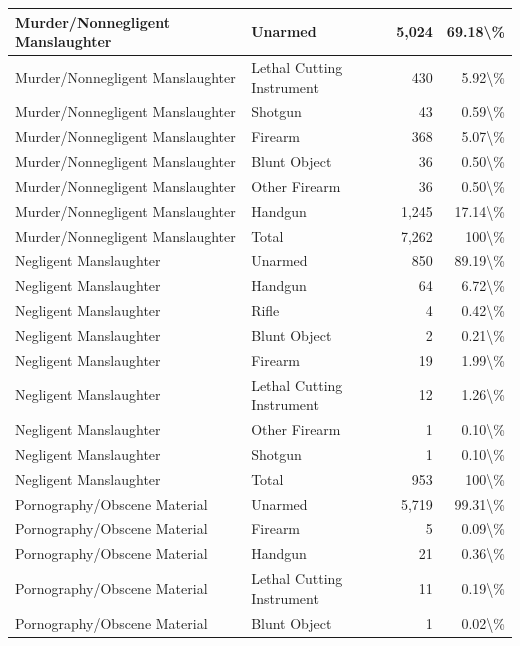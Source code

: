 \documentclass[
]{krantz}
\begin{document}
\begin{longtable}[t]{l|l|r|r}
\hline
Murder/Nonnegligent Manslaughter & Unarmed & 5,024 & 69.18\textbackslash{}\%\\
\hline
Murder/Nonnegligent Manslaughter & Lethal Cutting Instrument & 430 & 5.92\textbackslash{}\%\\
\hline
Murder/Nonnegligent Manslaughter & Shotgun & 43 & 0.59\textbackslash{}\%\\
\hline
Murder/Nonnegligent Manslaughter & Firearm & 368 & 5.07\textbackslash{}\%\\
\hline
Murder/Nonnegligent Manslaughter & Blunt Object & 36 & 0.50\textbackslash{}\%\\
\hline
Murder/Nonnegligent Manslaughter & Other Firearm & 36 & 0.50\textbackslash{}\%\\
\hline
Murder/Nonnegligent Manslaughter & Handgun & 1,245 & 17.14\textbackslash{}\%\\
\hline
Murder/Nonnegligent Manslaughter & Total & 7,262 & 100\textbackslash{}\%\\
\hline
Negligent Manslaughter & Unarmed & 850 & 89.19\textbackslash{}\%\\
\hline
Negligent Manslaughter & Handgun & 64 & 6.72\textbackslash{}\%\\
\hline
Negligent Manslaughter & Rifle & 4 & 0.42\textbackslash{}\%\\
\hline
Negligent Manslaughter & Blunt Object & 2 & 0.21\textbackslash{}\%\\
\hline
Negligent Manslaughter & Firearm & 19 & 1.99\textbackslash{}\%\\
\hline
Negligent Manslaughter & Lethal Cutting Instrument & 12 & 1.26\textbackslash{}\%\\
\hline
Negligent Manslaughter & Other Firearm & 1 & 0.10\textbackslash{}\%\\
\hline
Negligent Manslaughter & Shotgun & 1 & 0.10\textbackslash{}\%\\
\hline
Negligent Manslaughter & Total & 953 & 100\textbackslash{}\%\\
\hline
Pornography/Obscene Material & Unarmed & 5,719 & 99.31\textbackslash{}\%\\
\hline
Pornography/Obscene Material & Firearm & 5 & 0.09\textbackslash{}\%\\
\hline
Pornography/Obscene Material & Handgun & 21 & 0.36\textbackslash{}\%\\
\hline
Pornography/Obscene Material & Lethal Cutting Instrument & 11 & 0.19\textbackslash{}\%\\
\hline
Pornography/Obscene Material & Blunt Object & 1 & 0.02\textbackslash{}\%\\

\end{longtable}
\end{document}
